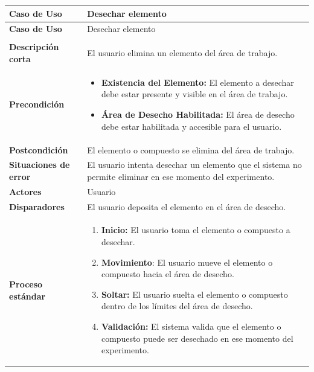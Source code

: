 \begin{longtable}{>{\raggedright\arraybackslash}m{} >{\raggedright\arraybackslash}m{}}
    \toprule\toprule
    \textbf{Caso de Uso} & Desechar elemento \\
    \midrule\midrule
    \endfirsthead

    \toprule\toprule
    \textbf{Caso de Uso} & Desechar elemento \\
    \midrule\midrule
    \endhead

    \midrule
    \multicolumn{2}{r}{\textit{Continúa en la siguiente página}} \\
    \midrule
    \endfoot

    \endlastfoot

    \textbf{Descripción corta} & El usuario elimina un elemento del área de trabajo.\\
    \midrule
    \textbf{Precondición} & 
    \begin{itemize}
        \item \textbf{Existencia del Elemento:} El elemento a desechar debe estar presente y visible en el área de trabajo.
        \item \textbf{Área de Desecho Habilitada:} El área de desecho debe estar habilitada y accesible para el usuario.
    \end{itemize}\\
    \midrule
    \textbf{Postcondición} & El elemento o compuesto se elimina del área de trabajo.\\
    \midrule
    \textbf{Situaciones de error} & El usuario intenta desechar un elemento que el sistema no permite eliminar en ese momento del experimento.\\
    \midrule
    \textbf{Actores} & Usuario \\
    \midrule
    \textbf{Disparadores} &  El usuario deposita el elemento en el área de desecho.\\
    \midrule
    \textbf{Proceso estándar} &
    \begin{enumerate}
        \item \textbf{Inicio:} El usuario toma el elemento o compuesto a desechar.
        \item \textbf{Movimiento}: El usuario mueve el elemento o compuesto hacia el área de desecho.
        \item \textbf{Soltar:} El usuario suelta el elemento o compuesto dentro de los límites del área de desecho.
        \item \textbf{Validación:} El sistema valida que el elemento o compuesto puede ser desechado en ese momento del experimento.

\end{enumerate}
\end{longtable}
